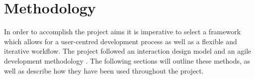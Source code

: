 \chapter{Methodology}
In order to accomplish the project aims it is imperative to select a framework which allows for a user-centred development process as well as a flexible and iterative workflow. The project followed an interaction design model \cite{Sharp2011} and an agile development methodology \cite{Martin2002}. The following sections will outline these methods, as well as describe how they have been used throughout the project.



\iffalse\fi